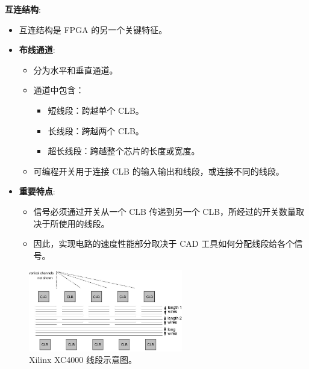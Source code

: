 \begin{frame}[allowframebreaks]{\textbf{互连结构}:}
\begin{itemize}
\tightlist
\item
    互连结构是 FPGA 的另一个关键特征。
\item
    \textbf{布线通道}:

    \begin{itemize}
    \tightlist
    \item
    分为水平和垂直通道。
    \item
    通道中包含：

    \begin{itemize}
    \tightlist
    \item
        短线段：跨越单个 CLB。
    \item
        长线段：跨越两个 CLB。
    \item
        超长线段：跨越整个芯片的长度或宽度。
    \end{itemize}
    \item
    可编程开关用于连接 CLB 的输入输出和线段，或连接不同的线段。
    \end{itemize}
\item
    \textbf{重要特点}:

    \begin{itemize}
    \tightlist
    \item
    信号必须通过开关从一个 CLB 传递到另一个
    CLB，所经过的开关数量取决于所使用的线段。
    \item
    因此，实现电路的速度性能部分取决于 CAD 工具如何分配线段给各个信号。
    \end{itemize}
\end{itemize}

\begin{figure}
    \centering
    \includegraphics[width=0.6\textwidth,keepaspectratio]{img1/XC4000Wire.jpeg}
    \caption{Xilinx XC4000 线段示意图。}
\end{figure}

\end{frame}

